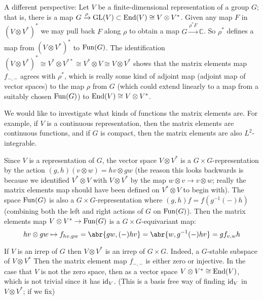 \documentclass[../../rtnotes.tex]{subfiles}
\begin{document}
A different perspective: Let $V$ be a finite-dimensional representation of a group $G$; that is, there is a map $G\xrightarrow{\rho}\operatorname{GL}(V)\subset \operatorname{End}(V)\cong V\otimes V^\ast$. Given any map $F$ in $(V\otimes V^\ast)^\ast$ we may pull back $F$ along $\rho$ to obtain a map $G\xrightarrow{\rho^\ast F}\mathbb C$. So $\rho^\ast$ defines a map from $(V\otimes V^\ast)^\ast$ to $\operatorname{Fun}(G)$. The identification $(V\otimes V^\ast)^\ast\cong V^\ast\otimes V^{\ast\ast}\cong V^\ast\otimes V\cong V\otimes V^\ast$ shows that the matrix elements map $f_{-,-}$ agrees with $\rho^\ast$, which is really some kind of adjoint map (adjoint map of vector spaces) to the map $\rho$ from $G$ (which could extend linearly to a map from a suitably chosen $\operatorname{Fun}(G)$) to $\operatorname{End}(V)\cong V\otimes V^\ast$.

We would like to investigate what kinds of functions the matrix elements are. For example, if $V$ is a continuous representation, then the matrix elements are continuous functions, and if $G$ is compact, then the matrix elements are also $L^2$-integrable. 

Since $V$ is a representation of $G$, the vector space $V\otimes V^\ast$ is a $G\times G$-representation by the action $(g,h)(v\otimes w) = hv\otimes gw$ (the reason this looks backwards is because we identified $V^\ast\otimes V$ with $V\otimes V^\ast$ by the map $w\otimes v\to v\otimes w$; really the matrix elements map should have been defined on $V^\ast\otimes V$ to begin with). The space $\operatorname{Fun}(G)$ is also a $G\times G$-representation where $(g,h)f = f(g^{-1}(-)h)$ (combining both the left and right actions of $G$ on $\operatorname{Fun}(G)$). Then the matrix elements map $V\otimes V^\ast\to \operatorname{Fun}(G)$ is a $G\times G$-equivariant map:
\[hv\otimes gw\mapsto f_{hv,gw} = \abr{gw,(-)hv} = \abr{w,g^{-1}(-)hv} = gf_{v,w}h\]

If $V$ is an irrep of $G$ then $V\otimes V^\ast$ is an irrep of $G\times G$. Indeed, a $G$-stable subspace of $V\otimes V^\ast$ Then the matrix element map $f_{-,-}$ is either zero or injective. In the case that $V$ is not the zero space, then as a vector space $V\otimes V^\ast\cong \operatorname{End}(V)$, which is not trivial since it has $\operatorname{id}_V$. (This is a basis free way of finding $\operatorname{id}_V$ in $V\otimes V^\ast$; if we fix)
\end{document}
